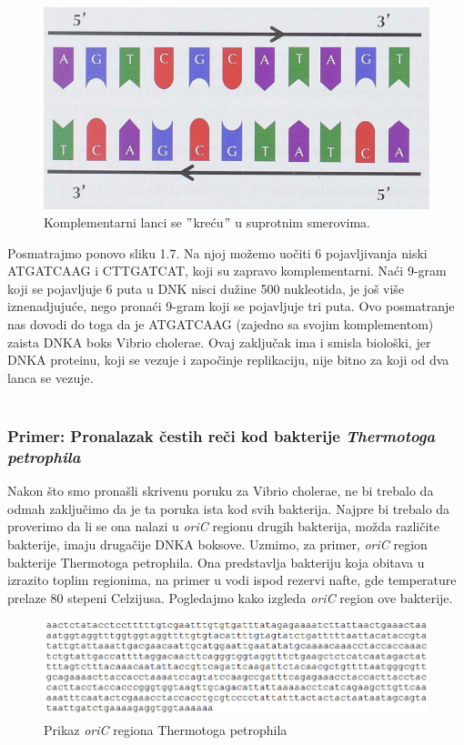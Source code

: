 \begin{figure}[h]
\caption{Komplementarni lanci se $"$kreću$"$ u suprotnim smerovima.}
\centering
\includegraphics[width=1\textwidth]{poglavlja/1/slike/Komplementarni.png}
\end{figure} 

Posmatrajmo ponovo sliku 1.7. Na njoj možemo uočiti 6 pojavljivanja niski ATGATCAAG i CTTGATCAT, koji su zapravo komplementarni. Naći 9-gram koji se pojavljuje 6 puta u DNK nisci dužine 500 nukleotida, je još više iznenadjujuće, nego pronaći 9-gram koji se pojavljuje tri puta. Ovo posmatranje nas dovodi do toga da je ATGATCAAG (zajedno sa svojim komplementom) zaista DNKA boks Vibrio cholerae. Ovaj zaključak ima i smisla biološki, jer DNKA proteinu, koji se vezuje i započinje replikaciju, nije bitno za koji od dva lanca se vezuje.\\\\

\subsubsection{Primer: Pronalazak čestih reči kod bakterije \textit{Thermotoga petrophila}} 

Nakon što smo pronašli skrivenu poruku za Vibrio cholerae, ne bi trebalo da odmah zaključimo da je ta poruka ista kod svih bakterija. Najpre bi trebalo da proverimo da li se ona nalazi u \textit{oriC} regionu drugih bakterija, možda različite bakterije, imaju drugačije DNKA boksove. Uzmimo, za primer, \textit{oriC} region bakterije Thermotoga petrophila. Ona predstavlja bakteriju koja obitava u izrazito toplim regionima, na primer u vodi ispod rezervi nafte, gde temperature prelaze 80 stepeni Celzijusa. Pogledajmo kako izgleda \textit{oriC} region ove bakterije.

\begin{figure}[h]
\caption{Prikaz \textit{oriC} regiona Thermotoga petrophila}
\centering
\includegraphics[width=1\textwidth]{poglavlja/1/slike/OriC_TP.png}
\end{figure} 


